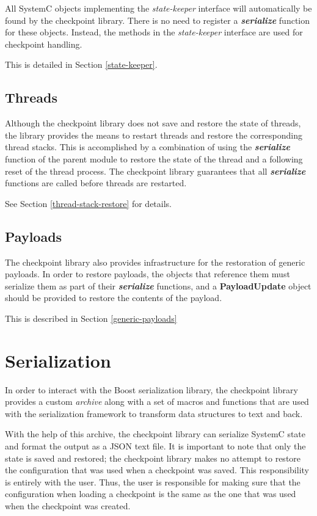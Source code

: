 \documentclass[oneside]{memoir}
\begin{document}
All SystemC objects implementing the \textit{state-keeper} interface will automatically be found by the checkpoint library.
There is no need to register a \textit{\textbf{serialize}} function for these objects.
Instead, the methods in the \textit{state-keeper} interface are used for checkpoint handling.

This is detailed in Section \ref{state-keeper}.

\section{Threads}
\label{overview-threads}

Although the checkpoint library does not save and restore the state of threads, the library provides the means to restart threads and restore the corresponding thread stacks.
This is accomplished by a combination of using the \textit{\textbf{serialize}} function of the parent module to restore the state of the thread and a following reset of the thread process.
The checkpoint library guarantees that all \textit{\textbf{serialize}} functions are called before threads are restarted.

See Section \ref{thread-stack-restore} for details.

\section{Payloads}
\label{overview-payloads}

The checkpoint library also provides infrastructure for the restoration of generic payloads.
In order to restore payloads, the objects that reference them must serialize them as part of their \textit{\textbf{serialize}} functions, and a \textbf{PayloadUpdate} object should be provided to restore the contents of the payload.

This is described in Section \ref{generic-payloads}

\chapter{Serialization}
\label{serialization}

In order to interact with the Boost serialization library, the checkpoint library provides a custom \textit{archive} along with a set of macros and functions that are used with the serialization framework to transform data structures to text and back.

With the help of this archive, the checkpoint library can serialize SystemC state and format the output as a JSON text file.
It is important to note that only the state is saved and restored; the checkpoint library makes no attempt to restore the configuration that was used when a checkpoint was saved.
This responsibility is entirely with the user.
Thus, the user is responsible for making sure that the configuration when loading a checkpoint is the same as the one that was used when the checkpoint was created.
\end{document}
